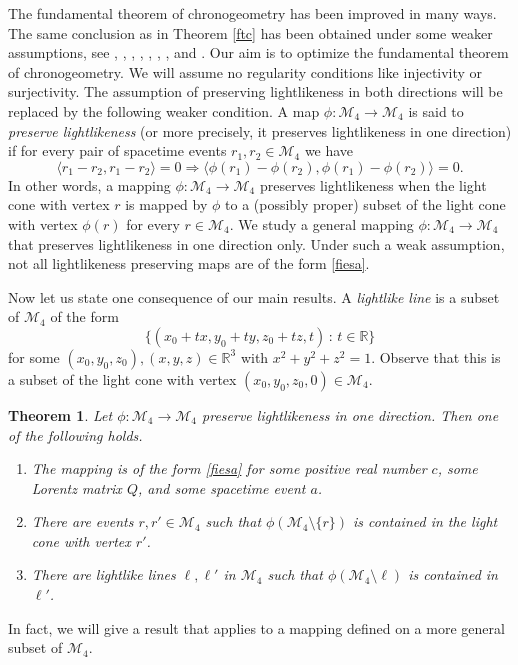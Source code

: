 \documentclass[10pt]{amsart}
\newtheorem{theorem}{Theorem}[section]
\theoremstyle{definition}
\theoremstyle{remark}
\numberwithin{subsection}{section}
\numberwithin{equation}{section}
\newcommand\cM{{\mathcal{M}}}
\begin{document}
The fundamental theorem of chronogeometry has been improved in many ways. The same conclusion as in Theorem \ref{ftc} has been obtained under some weaker assumptions, see \cite{BoH}, \cite{ChP}, \cite{Les}, \cite{LeM}, \cite{Pfe}, \cite{PoR}, \cite{Sch}, and \cite{Zee}. Our aim is to optimize the fundamental theorem of chronogeometry.
We will assume no regularity conditions like injectivity or surjectivity. 
The assumption of preserving lightlikeness in both directions will be replaced by the following weaker condition.
A map $\phi \colon \mathcal{M}_4 \to \mathcal{M}_4$ is said to \emph{preserve lightlikeness}  (or more precisely, it preserves lightlikeness in one direction) if 
for every pair of spacetime events $r_1, r_2 \in \mathcal{M}_4$ we have
\[
\langle r_1 - r_2 , r_1 - r_2 \rangle = 0 \Rightarrow \langle \phi (r_1 ) - \phi ( r_2 ) , \phi ( r_1 ) - \phi ( r_2 ) \rangle = 0.
\]
In other words, a mapping $\phi \colon \mathcal{M}_4 \to \mathcal{M}_4$ preserves lightlikeness when the light cone with vertex $r$ is mapped by $\phi$ to a (possibly proper) subset of the light cone with vertex $\phi(r)$ for every $r\in \cM_4$.
We study a general mapping $\phi \colon \mathcal{M}_4 \to \mathcal{M}_4$ that preserves lightlikeness in one direction only.
Under such a weak assumption, not all lightlikeness preserving maps are of the form \eqref{fiesa}. 

Now let us state one consequence of our main results. 
A \emph{lightlike line}  is a subset of $\mathcal{M}_4$ of the form 
\[
\{(x_0+tx, y_0+ty, z_0+tz, t)\,:\, t\in \mathbb{R}\}
\]
for some $(x_0, y_0, z_0), (x,y,z) \in \mathbb{R}^3$ with $x^2+y^2+z^2=1$. 
Observe that this is a subset of the light cone with vertex $(x_0,y_0, z_0, 0)\in \cM_4$.
\begin{theorem}\label{MM}
Let $\phi\colon \mathcal{M}_4\to \mathcal{M}_4$ preserve lightlikeness in one direction. 
Then one of the following holds.
\begin{enumerate}
\item The mapping is of the form \eqref{fiesa} for some positive real number $c$, some Lorentz matrix $Q$, and some spacetime event $a$. 
\item There are events $r, r'\in \mathcal{M}_4$ such that $\phi(\mathcal{M}_4\setminus\{r\})$ is contained in the light cone with vertex $r'$. 
\item There are lightlike lines $\ell, \ell'$ in $\mathcal{M}_4$ such that $\phi(\mathcal{M}_4\setminus \ell)$ is contained in $\ell'$. 
\end{enumerate}
\end{theorem}
In fact, we will give a result that applies to a mapping defined on a more general subset of $\mathcal{M}_4$.
\end{document}
